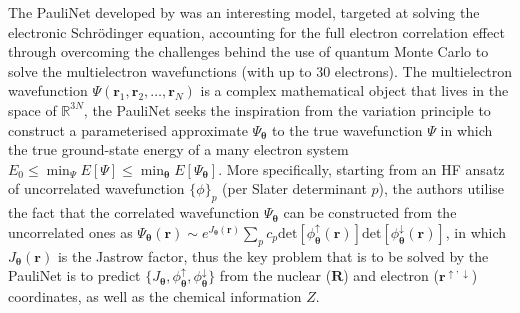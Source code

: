 The PauliNet developed by \citet{Hermann2020-ao} was an interesting model, targeted at solving the  electronic Schr\"{o}dinger equation, accounting for the full electron correlation effect through overcoming the challenges behind the use of quantum Monte Carlo to solve the multielectron wavefunctions (with up to 30 electrons). The multielectron wavefunction $\Psi(\bm{r}_1,\bm{r}_{2},\ldots,\bm{r}_N)$ is a complex mathematical object that lives in the space of $\mathbb{R}^{3N}$, the PauliNet seeks the inspiration from the variation principle to construct a parameterised approximate $\Psi_{\boldsymbol{\theta}}$ to the true wavefunction $\Psi$ in which the true ground-state energy of a many electron system $E_{0}\leq\min_{\Psi}E[\Psi]\leq \min_{\boldsymbol{\theta}}E[\Psi_{\boldsymbol{\theta}}]$. More specifically, starting from an HF ansatz of uncorrelated wavefunction $\{\phi\}_p$ (per Slater determinant $p$), the authors utilise the fact that the correlated wavefunction $\Psi_{\boldsymbol{\theta}}$ can be constructed from the uncorrelated ones as $\Psi_{\boldsymbol{\theta}}(\bm{r})\sim e^{J_{\boldsymbol{\theta}}(\bm{r})}\sum_p c_p\mbox{det}[\phi_{\boldsymbol{\theta}}^{\uparrow}(\bm{r})]\mbox{det}[\phi_{\boldsymbol{\theta}}^{\downarrow}(\bm{r})]$, in which 
 $J_{\boldsymbol{\theta}}(\bm{r})$ is the Jastrow factor, thus the key problem that is to be solved by the PauliNet is to predict $\{J_{\boldsymbol{\theta}},\phi_{\boldsymbol{\theta}}^{\uparrow},\phi_{\boldsymbol{\theta}}^{\downarrow}\}$  from the nuclear ($\bm{R}$) and electron ($\bm{r}^{\uparrow,\downarrow}$) coordinates, as well as the chemical information $Z$.

